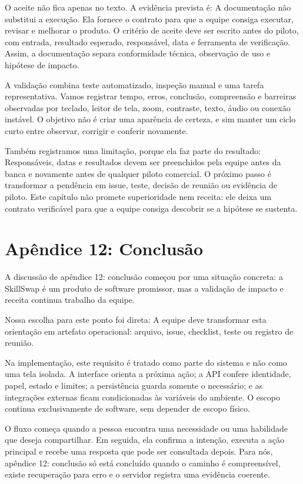 \documentclass[12pt,oneside,a4paper,article]{abntex2}
\begin{document}
O aceite não fica apenas no texto. A evidência prevista é: A documentação não substitui a execução. Ela fornece o contrato para que a equipe consiga executar, revisar e melhorar o produto. O critério de aceite deve ser escrito antes do piloto, com entrada, resultado esperado, responsável, data e ferramenta de verificação. Assim, a documentação separa conformidade técnica, observação de uso e hipótese de impacto.

A validação combina teste automatizado, inspeção manual e uma tarefa representativa. Vamos registrar tempo, erros, conclusão, compreensão e barreiras observadas por teclado, leitor de tela, zoom, contraste, texto, áudio ou conexão instável. O objetivo não é criar uma aparência de certeza, e sim manter um ciclo curto entre observar, corrigir e conferir novamente.

Também registramos uma limitação, porque ela faz parte do resultado: Responsáveis, datas e resultados devem ser preenchidos pela equipe antes da banca e novamente antes de qualquer piloto comercial. O próximo passo é transformar a pendência em issue, teste, decisão de reunião ou evidência de piloto. Este capítulo não promete superioridade nem receita: ele deixa um contrato verificável para que a equipe consiga descobrir se a hipótese se sustenta.

\section{Apêndice 12: Conclusão}
A discussão de apêndice 12: conclusão começou por uma situação concreta: a SkillSwap é um produto de software promissor, mas a validação de impacto e receita continua trabalho da equipe.

Nossa escolha para este ponto foi direta: A equipe deve transformar esta orientação em artefato operacional: arquivo, issue, checklist, teste ou registro de reunião.

Na implementação, este requisito é tratado como parte do sistema e não como uma tela isolada. A interface orienta a próxima ação; a API confere identidade, papel, estado e limites; a persistência guarda somente o necessário; e as integrações externas ficam condicionadas às variáveis do ambiente. O escopo continua exclusivamente de software, sem depender de escopo físico.

O fluxo começa quando a pessoa encontra uma necessidade ou uma habilidade que deseja compartilhar. Em seguida, ela confirma a intenção, executa a ação principal e recebe uma resposta que pode ser consultada depois. Para nós, apêndice 12: conclusão só está concluído quando o caminho é compreensível, existe recuperação para erro e o servidor registra uma evidência coerente.
\end{document}
